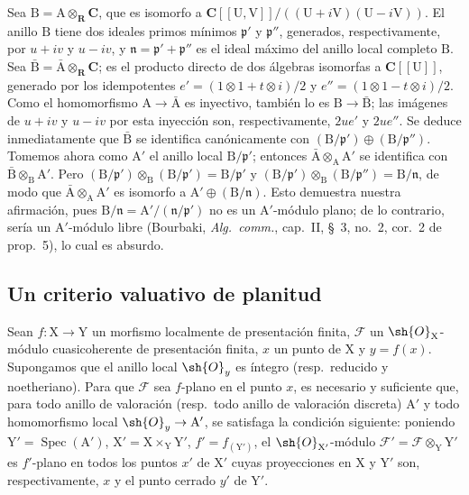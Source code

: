 \begin{env}[11.7.5]
Sea $\mathrm{B}=\mathrm{A}\otimes_\mathbf{R}\mathbf{C}$, que es isomorfo a $\mathbf{C}[[\mathrm{U},\mathrm{V}]]/((\mathrm{U}+i\mathrm{V})(\mathrm{U}-i\mathrm{V}))$.
El anillo $\mathrm{B}$ tiene dos ideales primos mínimos $\mathfrak{p}'$ y $\mathfrak{p}''$, generados, respectivamente, por $u+iv$ y $u-iv$, y $\mathfrak{n}=\mathfrak{p}'+\mathfrak{p}''$ es el ideal máximo del anillo local completo $\mathrm{B}$.
Sea $\bar{\mathrm{B}}=\bar{\mathrm{A}}\otimes_\mathbf{R}\mathbf{C}$; es el producto directo de dos álgebras isomorfas a $\mathbf{C}[[\mathrm{U}]]$, generado por los idempotentes $e'=(1\otimes 1+t\otimes i)/2$ y $e''=(1\otimes 1-t\otimes i)/2$.
Como el homomorfismo $\mathrm{A}\to\bar{\mathrm{A}}$ es inyectivo, también lo es $\mathrm{B}\to\bar{\mathrm{B}}$; las imágenes de $u+iv$ y $u-iv$ por esta inyección son, respectivamente, $2ue'$ y $2ue''$.
Se deduce inmediatamente que $\bar{\mathrm{B}}$ se identifica canónicamente con $(\mathrm{B}/\mathfrak{p}')\oplus(\mathrm{B}/\mathfrak{p}'')$.
Tomemos ahora como $\mathrm{A}'$ el anillo local $\mathrm{B}/\mathfrak{p}'$; entonces $\bar{\mathrm{A}}\otimes_\mathrm{A}\mathrm{A}'$ se identifica con $\bar{\mathrm{B}}\otimes_\mathrm{B}\mathrm{A}'$.
Pero $(\mathrm{B}/\mathfrak{p}')\otimes_\mathrm{B}(\mathrm{B}/\mathfrak{p}')=\mathrm{B}/\mathfrak{p}'$ y $(\mathrm{B}/\mathfrak{p}')\otimes_\mathrm{B}(\mathrm{B}/\mathfrak{p}'')=\mathrm{B}/\mathfrak{n}$, de modo que $\bar{\mathrm{A}}\otimes_\mathrm{A}\mathrm{A}'$ es isomorfo a $\mathrm{A}'\oplus(\mathrm{B}/\mathfrak{n})$.
Esto demuestra nuestra afirmación, pues $\mathrm{B}/\mathfrak{n}=\mathrm{A}'/(\mathfrak{n}/\mathfrak{p}')$ no es un $\mathrm{A}'$-módulo plano; de lo contrario, sería un $\mathrm{A}'$-módulo libre (Bourbaki, \emph{Alg.\ comm.}, cap.~II, \S~3, no.~2, cor.~2 de prop.~5), lo cual es absurdo.
\end{env}

\subsection{Un criterio valuativo de planitud}
\label{subsection:IV.11.8}

\begin{theorem}[11.8.1]
\label{IV.11.8.1}
Sean $f:\mathrm{X}\to\mathrm{Y}$ un morfismo localmente de presentación finita, $\mathscr{F}$ un $\sh{O}_\mathrm{X}$-módulo cuasicoherente de presentación finita, $x$ un punto de $\mathrm{X}$ y $y=f(x)$.
Supongamos que el anillo local $\sh{O}_y$ es íntegro (resp.\ reducido y noetheriano).
Para que $\mathscr{F}$ sea $f$-plano en el punto $x$, es necesario y suficiente que, para todo anillo de valoración (resp.\ todo anillo de valoración discreta) $\mathrm{A}'$ y todo homomorfismo local $\sh{O}_y\to\mathrm{A}'$, se satisfaga la condición siguiente: poniendo $\mathrm{Y}'=\operatorname{Spec}(\mathrm{A}')$, $\mathrm{X}'=\mathrm{X}\times_\mathrm{Y}\mathrm{Y}'$, $f'=f_{(\mathrm{Y}')}$, el $\sh{O}_{\mathrm{X}'}$-módulo $\mathscr{F}'=\mathscr{F}\otimes_\mathrm{Y}\mathrm{Y}'$ es $f'$-plano en todos los puntos $x'$ de $\mathrm{X}'$ cuyas proyecciones en $\mathrm{X}$ y $\mathrm{Y}'$ son, respectivamente, $x$ y el punto cerrado $y'$ de $\mathrm{Y}'$.
\end{theorem}

